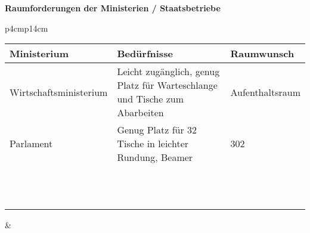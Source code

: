 \documentclass[12pt]{article}
\begin{document}
\textbf{\LARGE{Raumforderungen der Ministerien / Staatsbetriebe}}

\renewcommand{\arraystretch}{1.5}

\vspace{5mm}
\begin{tabular}{p{4cm}p{14cm}}
    \begin{tabular}{|p{}|p{}|p{}|}
        \hline
        \textbf{Ministerium} & \textbf{Bedürfnisse} & \textbf{Raumwunsch} \\ \hline
        Wirtschaftsministerium & Leicht zugänglich, genug Platz für Warteschlange und Tische
        zum Abarbeiten & Aufenthaltsraum \\ \hline
        Parlament & Genug Platz für 32 Tische in leichter Rundung, Beamer & 302 \\ \hline
        & & \\ \hline
        & & \\ \hline
        & & \\ \hline
        & & \\ \hline
        & & \\ \hline
        & & \\ \hline
        & & \\ \hline
        & & \\ \hline
        & & \\ \hline
        & & \\ \hline
        & & \\ \hline
        & & \\ \hline
    \end{tabular} & \\
\end{tabular}
\end{document}
